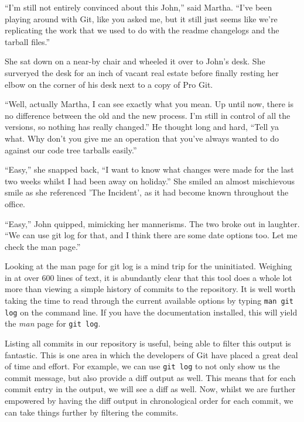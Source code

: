 \begin{trenches}
``I'm still not entirely convinced about this John,'' said Martha.  ``I've been playing around with Git, like you asked me, but it still just seems like we're replicating the work that we used to do with the readme changelogs and the tarball files.''

She sat down on a near-by chair and wheeled it over to John's desk.  She surveryed the desk for an inch of vacant real estate before finally resting her elbow on the corner of his desk next to a copy of Pro Git.

``Well, actually Martha, I can see exactly what you mean.  Up until now, there is no difference between the old and the new process.  I'm still in control of all the versions, so nothing has really changed.''  He thought long and hard, ``Tell ya what.  Why don't you give me an operation that you've always wanted to do against our code tree tarballs easily.''

``Easy,'' she snapped back, ``I want to know what changes were made for the last two weeks whilst I had been away on holiday.'' She smiled an almost mischievous smile as she referenced 'The Incident', as it had become known throughout the office.

``Easy,'' John quipped, mimicking her mannerisms.  The two broke out in laughter.  ``We can use git log for that, and I think there are some date options too.  Let me check the man page.''
\end{trenches}

Looking at the man page for git log is a mind trip for the uninitiated.  Weighing in at over 600 lines of text, it is abundantly clear that this tool does a whole lot more than viewing a simple history of commits to the repository.  It is well worth taking the time to read through the current available options by typing \texttt{man git log} on the command line.  If you have the documentation installed, this will yield the \emph{man} page for \texttt{git log}.

Listing all commits in our repository is useful, being able to filter this output is fantastic.  This is one area in which the developers of Git have placed a great deal of time and effort.  For example, we can use \texttt{git log} to not only show us the commit message, but also provide a diff output as well.  This means that for each commit entry in the output, we will see a diff as well.  Now, whilst we are further empowered by having the diff output in chronological order for each commit, we can take things further by filtering the commits.  

